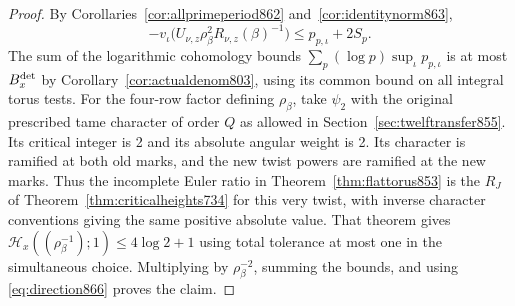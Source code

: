 \documentclass[a4paper,11pt]{article}
\theoremstyle{definition}
\theoremstyle{remark}
\numberwithin{equation}{section}
\begin{document}
\begin{proof}
By Corollaries~\ref{cor:allprimeperiod862} and~\ref{cor:identitynorm863},
\[
 -v_\iota\!\big(U_{\nu,z}\rho_\beta^2 R_{\nu,z}(\beta)^{-1}\big)
                         \le p_{p,\iota}+2S_p .
\]
The sum of the logarithmic cohomology bounds
\(\sum_p(\log p)\sup_\iota p_{p,\iota}\) is at most
\(B_x^{\rm det}\) by Corollary~\ref{cor:actualdenom803},
using its common bound on all integral torus tests.
For the four-row factor defining \(\rho_\beta\), take
\(\psi_2\) with the original prescribed tame character
of order \(Q\) as allowed in Section~\ref{sec:twelftransfer855}.
Its critical integer is 2 and its absolute angular weight
is 2. Its character is ramified at both old marks, and the
new twist powers are ramified at the new marks. Thus the
incomplete Euler ratio in Theorem~\ref{thm:flattorus853}
is the \(R_J\) of Theorem~\ref{thm:criticalheights734} for
this very twist, with inverse character conventions giving
the same positive absolute value. That theorem gives
\(\mathcal H_x((\rho_\beta^{-1});1)\le4\log2+1\)
using total tolerance at most one in the simultaneous
choice. Multiplying by \(\rho_\beta^{-2}\), summing the
bounds, and using \eqref{eq:direction866} proves the claim.
\end{proof}
\end{document}
